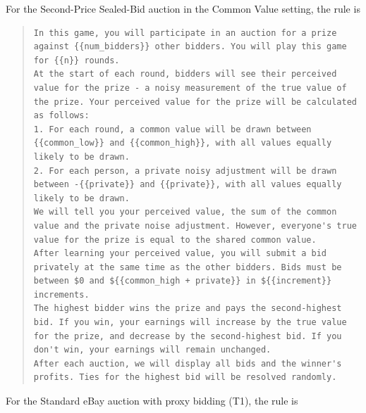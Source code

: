 \documentclass{article} %
\begin{document}
For the Second-Price Sealed-Bid auction in the Common Value setting, the rule is
\begin{quote}
\begin{lstlisting}[basicstyle=\ttfamily, breaklines=true]
In this game, you will participate in an auction for a prize against {{num_bidders}} other bidders. You will play this game for {{n}} rounds. 
At the start of each round, bidders will see their perceived value for the prize - a noisy measurement of the true value of the prize. Your perceived value for the prize will be calculated as follows:
1. For each round, a common value will be drawn between {{common_low}} and {{common_high}}, with all values equally likely to be drawn.
2. For each person, a private noisy adjustment will be drawn between -{{private}} and {{private}}, with all values equally likely to be drawn.
We will tell you your perceived value, the sum of the common value and the private noise adjustment. However, everyone's true value for the prize is equal to the shared common value. 
After learning your perceived value, you will submit a bid privately at the same time as the other bidders. Bids must be between $0 and ${{common_high + private}} in ${{increment}} increments. 
The highest bidder wins the prize and pays the second-highest bid. If you win, your earnings will increase by the true value for the prize, and decrease by the second-highest bid. If you don't win, your earnings will remain unchanged.
After each auction, we will display all bids and the winner's profits. Ties for the highest bid will be resolved randomly.\end{lstlisting}
\end{quote}

For the Standard eBay auction with proxy bidding (T1), the rule is
\end{document}
